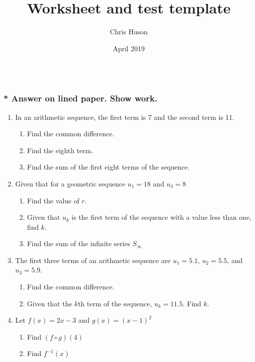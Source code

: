 \documentclass[12pt, oneside]{article}
\title{Worksheet and test template}
\author{Chris Huson}
\date{April 2019}
\begin{document}
\subsubsection*{\\* Answer on lined paper. Show work.}

\begin{enumerate}

\vspace{0.5 cm}


\item In an arithmetic sequence, the first term is 7 and the second term is 11.
\begin{enumerate}
    \item Find the common difference.
    \item Find the eighth term.
    \item Find the sum of the first eight terms of the sequence.
\end{enumerate}

\item Given that for a geometric sequence $u_1=18$ and $u_3=8$
\begin{enumerate}
    \item Find the value of $r$.
    \item Given that $u_k$ is the first term of the sequence with a value less than one, find $k$.
    \item Find the sum of the infinite series $S_\infty$
\end{enumerate}

\item The first three terms of an arithmetic sequence are $u_1=5.1$, $u_2=5.5$, and $u_3=5.9$.
\begin{enumerate}
    \item Find the common difference.
    \item Given that the $k$th term of the sequence, $u_k=11.5$. Find $k$.
\end{enumerate}

\item Let $f(x) = 2x -3$ and $g(x)=(x-1)^2$
\begin{enumerate}
    \item Find $(f \circ g)(4)$
    \item Find $f^{-1}(x)$
\end{enumerate}


\end{enumerate}
\end{document}
